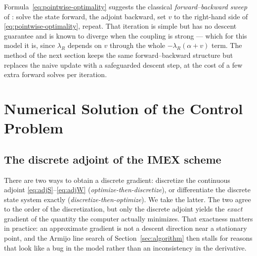 \documentclass[11pt]{article}
\begin{document}
Formula~\eqref{eq:pointwise-optimality} suggests the classical \emph{forward--backward sweep} of \citet{Lenhart2007}: solve the state forward, the adjoint backward, set $v$ to the right-hand side of \eqref{eq:pointwise-optimality}, repeat. That iteration is simple but has no descent guarantee and is known to diverge when the coupling is strong --- which for this model it is, since $\lambda_R$ depends on $v$ through the whole $-\lambda_R(\alpha+v)$ term. The method of the next section keeps the same forward--backward structure but replaces the naive update with a safeguarded descent step, at the cost of a few extra forward solves per iteration.

\section{Numerical Solution of the Control Problem}
\label{sec:control-numerics}

\subsection{The discrete adjoint of the IMEX scheme}
\label{sec:discrete-adjoint}

There are two ways to obtain a discrete gradient: discretize the continuous adjoint \eqref{eq:adjS}--\eqref{eq:adjW} (\emph{optimize-then-discretize}), or differentiate the discrete state system exactly (\emph{discretize-then-optimize}). We take the latter. The two agree to the order of the discretization, but only the discrete adjoint yields the \emph{exact} gradient of the quantity the computer actually minimizes. That exactness matters in practice: an approximate gradient is not a descent direction near a stationary point, and the Armijo line search of Section~\ref{sec:algorithm} then stalls for reasons that look like a bug in the model rather than an inconsistency in the derivative.
\end{document}
